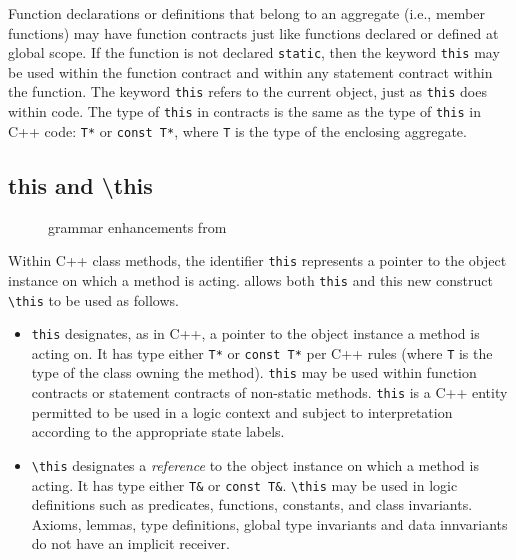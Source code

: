 Function declarations or definitions that belong to an aggregate (i.e., member functions) may have function
contracts just like functions declared or defined at global scope. If the function is not declared \lstinline|static|, then
the keyword \lstinline|this| may be used within the function
contract and within any statement contract within the 
function. The keyword \lstinline|this| refers to the current
object, just as \lstinline|this| does within \lang{} code.
The type of \lstinline|this| in contracts is the same as the type of \lstinline|this| in C++ code: \lstinline|T*| or \lstinline|const T*|, where \lstinline|T| is the type of the enclosing aggregate.


\subsection{\textbf{this} and \textbf{\textbackslash this}}


\begin{figure}
\begin{cadre}

\end{cadre}
\caption{\NAME{} grammar enhancements from \lang{}}
\label{fig:gram:this}
\end{figure}

Within C++ class methods, the identifier \lstinline|this| represents a
pointer to the object instance on which a method is acting. \NAME{}
allows both \lstinline|this| and this new construct \lstinline|\this| 
to be used as follows.
\begin{itemize}
\item \lstinline|this| designates, as in C++, a pointer to the object
instance a method is acting on. It has type either \lstinline|T*|
or \lstinline|const T*| per C++ rules (where \lstinline|T| is the type
of the class owning the method). \lstinline|this| may be used
within function contracts or statement contracts of non-static methods.
\lstinline|this| is a C++ entity permitted to be used in a logic context
and subject to interpretation according to the appropriate state labels.

\item \lstinline|\this| designates a \textit{reference} to the object
instance on which a method is acting. It has type either \lstinline|T&| or
\lstinline|const T&|. 
\lstinline|\this| may be used in logic definitions
such as predicates, functions, constants, and class invariants. Axioms, lemmas, type definitions, global type invariants and data innvariants
do not have an implicit receiver.

\end{itemize}


